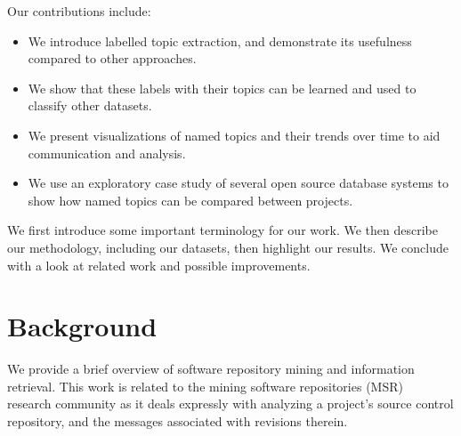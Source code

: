 \documentclass{acm_proc_article-sp}
\newcommand{\XXX}[1]{\textcolor{red}{{\it \textbf{[XXX: #1]}}}}
\begin{document}

Our contributions include:
\begin{itemize}
\item  We introduce labelled topic extraction, and demonstrate its usefulness
  compared to other approaches.
\item We show that these labels with their topics can be learned and used to classify other datasets.
\item We present visualizations of named topics and their trends over time to aid communication and analysis.
\item We use an exploratory case study of
  several open source database systems to show how named topics can be compared between projects.
\end{itemize}

We first introduce some important terminology for our work. We then describe our methodology, including our datasets, then highlight our results. We conclude with a look at related work and possible improvements.

\section{Background}

We provide a brief overview of software repository mining and information retrieval.
This work is related to the mining software repositories (MSR)~\cite{msr} research community as it deals expressly with analyzing a project's source control repository, and the messages associated with revisions therein.
\end{document}
